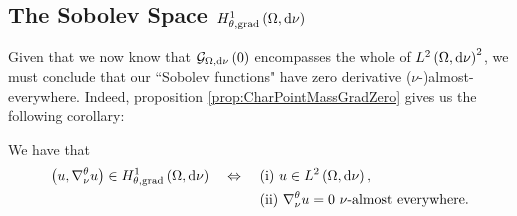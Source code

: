 \subsection{The Sobolev Space $H^1_{\theta, \mathrm{grad}}\left( \Omega, \mathrm{d}\nu \right)$} \label{appS:VertexSobSpace}
Given that we now know that $\mathcal{G}_{ \Omega, \mathrm{d}\nu}\left( 0 \right)$ encompasses the whole of $L^{2}\left( \Omega,\mathrm{d}\nu \right)^2$, we must conclude that our ``Sobolev functions" have zero derivative ($\nu$-)almost-everywhere.
Indeed, proposition \ref{prop:CharPointMassGradZero} gives us the following corollary:
\begin{cory} \label{cory:CharPointMassSpace}
	We have that
	\begin{align*}
		\left( u,\nabla^{\theta}_{\nu}u \right)\in H^1_{\theta, \mathrm{grad}}\left( \Omega, \mathrm{d}\nu \right) \quad\Leftrightarrow\quad 
		& \ \text{(i)} \ u\in L^{2}\left( \Omega,\mathrm{d}\nu \right), \\
		& \ \text{(ii)} \ \nabla^{\theta}_{\nu}u = 0 \ \nu\text{-almost everywhere}.
	\end{align*}
\end{cory}
